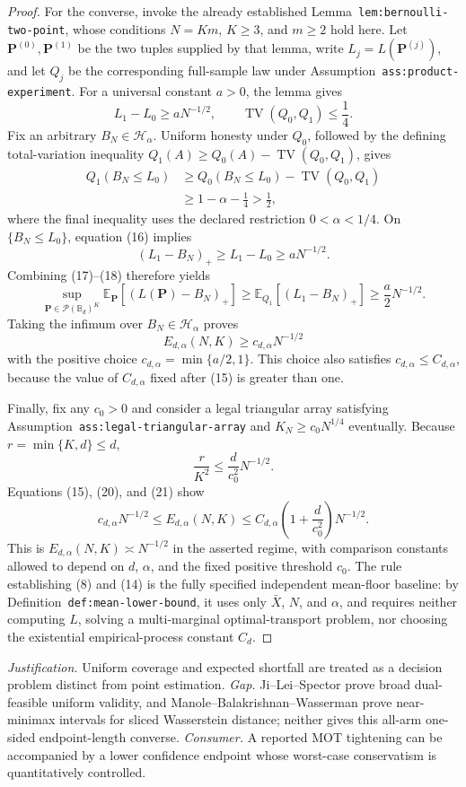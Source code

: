 \documentclass{article}
\begin{document}
\begin{proof}
For the converse, invoke the already established Lemma~\texttt{lem:bernoulli-two-point}, whose conditions \(N=Km\), \(K\geq3\), and \(m\geq2\) hold here. Let \(\mathbf P^{(0)},\mathbf P^{(1)}\) be the two tuples supplied by that lemma, write \(L_j=L(\mathbf P^{(j)})\), and let \(Q_j\) be the corresponding full-sample law under Assumption~\texttt{ass:product-experiment}. For a universal constant \(a>0\), the lemma gives
\[
L_1-L_0\geq aN^{-1/2},
\qquad
\operatorname{TV}(Q_0,Q_1)\leq\frac14. \tag{16}
\]
Fix an arbitrary \(B_N\in\mathcal H_\alpha\). Uniform honesty under \(Q_0\), followed by the defining total-variation inequality \(Q_1(A)\geq Q_0(A)-\operatorname{TV}(Q_0,Q_1)\), gives
\[
\begin{aligned}
Q_1(B_N\leq L_0)
&\geq Q_0(B_N\leq L_0)-\operatorname{TV}(Q_0,Q_1)\\
&\geq 1-\alpha-\frac14
>\frac12, \tag{17}
\end{aligned}
\]
where the final inequality uses the declared restriction \(0<\alpha<1/4\). On \(\{B_N\leq L_0\}\), equation (16) implies
\[
(L_1-B_N)_+\geq L_1-L_0\geq aN^{-1/2}. \tag{18}
\]
Combining (17)--(18) therefore yields
\[
\sup_{\mathbf P\in\mathcal P(\mathbb B_d)^K}
\mathbb E_{\mathbf P}[(L(\mathbf P)-B_N)_+]
\geq \mathbb E_{Q_1}[(L_1-B_N)_+]
\geq \frac a2N^{-1/2}. \tag{19}
\]
Taking the infimum over \(B_N\in\mathcal H_\alpha\) proves
\[
E_{d,\alpha}(N,K)\geq c_{d,\alpha}N^{-1/2} \tag{20}
\]
with the positive choice \(c_{d,\alpha}=\min\{a/2,1\}\). This choice also satisfies \(c_{d,\alpha}\leq C_{d,\alpha}\), because the value of \(C_{d,\alpha}\) fixed after (15) is greater than one.

Finally, fix any \(c_0>0\) and consider a legal triangular array satisfying Assumption~\texttt{ass:legal-triangular-array} and \(K_N\geq c_0N^{1/4}\) eventually. Because \(r=\min\{K,d\}\leq d\),
\[
\frac r{K^2}
\leq \frac d{c_0^2}N^{-1/2}. \tag{21}
\]
Equations (15), (20), and (21) show
\[
c_{d,\alpha}N^{-1/2}
\leq E_{d,\alpha}(N,K)
\leq C_{d,\alpha}\left(1+\frac d{c_0^2}\right)N^{-1/2}. \tag{22}
\]
This is \(E_{d,\alpha}(N,K)\asymp N^{-1/2}\) in the asserted regime, with comparison constants allowed to depend on \(d\), \(\alpha\), and the fixed positive threshold \(c_0\). The rule establishing (8) and (14) is the fully specified independent mean-floor baseline: by Definition~\texttt{def:mean-lower-bound}, it uses only \(\bar X\), \(N\), and \(\alpha\), and requires neither computing \(\widehat L\), solving a multi-marginal optimal-transport problem, nor choosing the existential empirical-process constant \(C_d\).
\end{proof}
\par\smallskip\noindent \textit{Justification.} Uniform coverage and expected shortfall are treated as a decision problem distinct from point estimation. \textit{Gap.} Ji--Lei--Spector prove broad dual-feasible uniform validity, and Manole--Balakrishnan--Wasserman prove near-minimax intervals for sliced Wasserstein distance; neither gives this all-arm one-sided endpoint-length converse. \textit{Consumer.} A reported MOT tightening can be accompanied by a lower confidence endpoint whose worst-case conservatism is quantitatively controlled.
\end{document}
